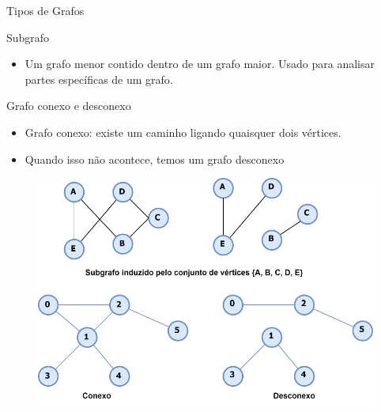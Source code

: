\documentclass{if-beamer}
\begin{document}
\begin{frame}{Tipos de Grafos} 

\justifying
Subgrafo
\begin{itemize}
\item  Um grafo menor contido dentro de um grafo maior. Usado para analisar partes específicas de um grafo.
\end{itemize} 
Grafo conexo e desconexo 
\begin{itemize}
\item  Grafo conexo: existe um caminho ligando quaisquer dois vértices.
\item  Quando isso não acontece, temos um grafo desconexo
\end{itemize} 

\begin{figure}[h]
\centering

  \includegraphics[scale=0.50]{Figuras/exemplos-grafo/n_svg-tex.pdf}
  
  \label{fig:imagem4}
\end{figure}
\end{frame}
\end{document}
